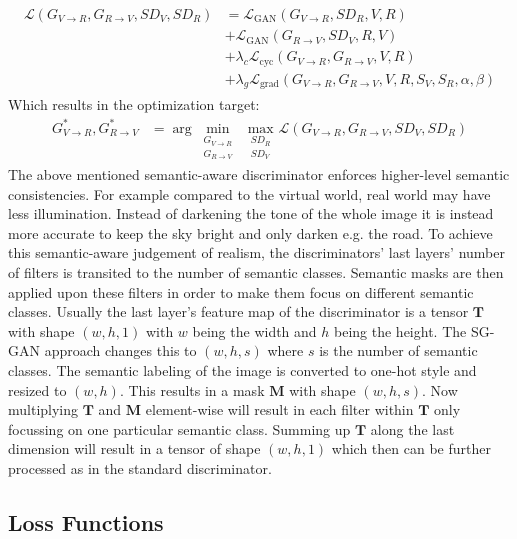 \begin{align}
	\begin{split}
		\mathcal{L}(G_{V\rightarrow R}, G_{R\rightarrow V}, SD_V, SD_R) &= \mathcal{L}_{\text{GAN}}(G_{V\rightarrow R}, SD_R, V, R)\\
		&+ \mathcal{L}_{\text{GAN}}(G_{R\rightarrow V}, SD_V, R, V)\\
		&+ \lambda_c \mathcal{L}_{\text{cyc}}(G_{V\rightarrow R}, G_{R\rightarrow V}, V, R)\\
		&+ \lambda_g \mathcal{L}_{\text{grad}}(G_{V\rightarrow R}, G_{R\rightarrow V}, V, R, S_V, S_R, \alpha, \beta)
	\end{split}
\end{align}
Which results in the optimization target:
\begin{align}
	G^*_{V\rightarrow R}, G^*_{R\rightarrow V} &= \arg \underset{\substack{G_{V\rightarrow R}\\ G_{R\rightarrow V}}}{\min}~ \underset{\substack{SD_R\\SD_V}}{\max}\mathcal{L}(G_{V\rightarrow R}, G_{R\rightarrow V}, SD_V, SD_R)
\end{align}
The above mentioned semantic-aware discriminator enforces higher-level semantic consistencies. For example compared to the virtual world, real world may have less illumination. Instead of darkening the tone of the whole image it is instead more accurate to keep the sky bright and only darken e.g. the road. To achieve this semantic-aware judgement of realism, the discriminators' last layers' number of filters is transited to the number of semantic classes. Semantic masks are then applied upon these filters in order to make them focus on different semantic classes. Usually the last layer's feature map of the discriminator is a tensor $\mathbf{T}$ with shape $(w,h,1)$ with $w$ being the width and $h$ being the height. The SG-GAN approach changes this to $(w,h,s)$ where $s$ is the number of semantic classes. The semantic labeling of the image is converted to one-hot style and resized to $(w,h)$. This results in a mask $\mathbf{M}$ with shape $(w,h,s)$. Now multiplying $\mathbf{T}$ and $\mathbf{M}$ element-wise will result in each filter within $\mathbf{T}$ only focussing on one particular semantic class. Summing up $\mathbf{T}$ along the last dimension will result in a tensor of shape $(w,h,1)$ which then can be further processed as in the standard discriminator. 

\subsection{Loss Functions}
